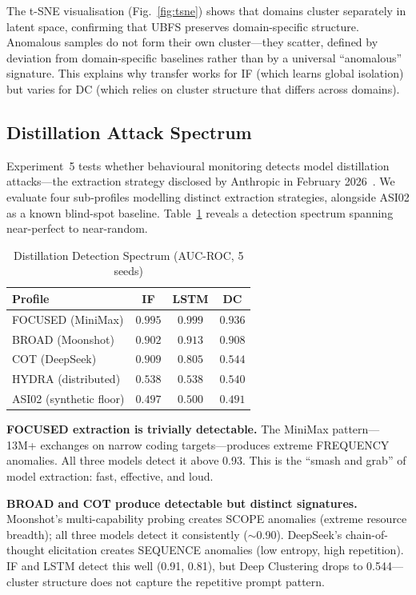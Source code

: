 \documentclass[conference]{IEEEtran}
\begin{document}
The t-SNE visualisation (Fig.~\ref{fig:tsne}) shows that domains cluster separately in latent space, confirming that UBFS preserves domain-specific structure. Anomalous samples do not form their own cluster---they scatter, defined by deviation from domain-specific baselines rather than by a universal ``anomalous'' signature. This explains why transfer works for IF (which learns global isolation) but varies for DC (which relies on cluster structure that differs across domains).

\subsection{Distillation Attack Spectrum}
\label{sec:distillation}

Experiment~5 tests whether behavioural monitoring detects model distillation attacks---the extraction strategy disclosed by Anthropic in February 2026~\cite{anthropic2026distillation}. We evaluate four sub-profiles modelling distinct extraction strategies, alongside ASI02 as a known blind-spot baseline. Table~\ref{tab:distillation} reveals a detection spectrum spanning near-perfect to near-random.

\begin{table}[htbp]
\caption{Distillation Detection Spectrum (AUC-ROC, 5 seeds)}
\label{tab:distillation}
\centering
\small
\begin{tabular}{lccc}
\toprule
\textbf{Profile} & \textbf{IF} & \textbf{LSTM} & \textbf{DC} \\
\midrule
FOCUSED (MiniMax) & $\mathbf{0.995}$ & $\mathbf{0.999}$ & $\mathbf{0.936}$ \\
BROAD (Moonshot) & $0.902$ & $0.913$ & $0.908$ \\
COT (DeepSeek) & $0.909$ & $0.805$ & $0.544$ \\
HYDRA (distributed) & $0.538$ & $0.538$ & $0.540$ \\
\addlinespace
ASI02 (synthetic floor) & $0.497$ & $0.500$ & $0.491$ \\
\bottomrule
\end{tabular}
\end{table}

\textbf{FOCUSED extraction is trivially detectable.} The MiniMax pattern---13M+ exchanges on narrow coding targets---produces extreme FREQUENCY anomalies. All three models detect it above 0.93. This is the ``smash and grab'' of model extraction: fast, effective, and loud.

\textbf{BROAD and COT produce detectable but distinct signatures.} Moonshot's multi-capability probing creates SCOPE anomalies (extreme resource breadth); all three models detect it consistently (${\sim}$0.90). DeepSeek's chain-of-thought elicitation creates SEQUENCE anomalies (low entropy, high repetition). IF and LSTM detect this well (0.91, 0.81), but Deep Clustering drops to 0.544---cluster structure does not capture the repetitive prompt pattern.
\end{document}
